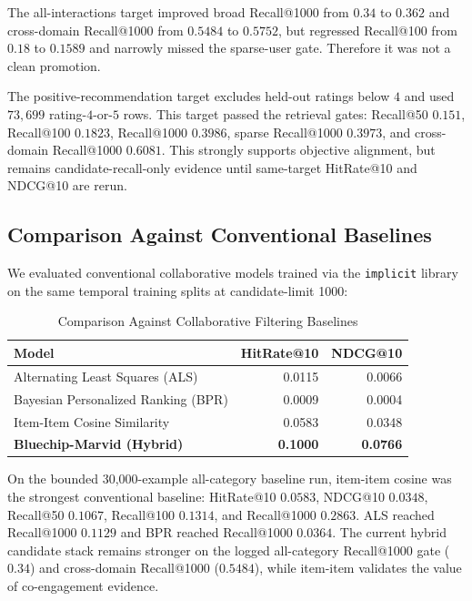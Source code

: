 \documentclass[11pt,a4paper]{article}
\begin{document}
The all-interactions target improved broad Recall@1000 from $0.34$ to $0.362$ and cross-domain Recall@1000 from $0.5484$ to $0.5752$, but regressed Recall@100 from $0.18$ to $0.1589$ and narrowly missed the sparse-user gate. Therefore it was not a clean promotion.

The positive-recommendation target excludes held-out ratings below $4$ and used $73{,}699$ rating-$4$-or-$5$ rows. This target passed the retrieval gates: Recall@50 $0.151$, Recall@100 $0.1823$, Recall@1000 $0.3986$, sparse Recall@1000 $0.3973$, and cross-domain Recall@1000 $0.6081$. This strongly supports objective alignment, but remains candidate-recall-only evidence until same-target HitRate@10 and NDCG@10 are rerun.

\subsection{Comparison Against Conventional Baselines}
We evaluated conventional collaborative models trained via the \texttt{implicit} library on the same temporal training splits at candidate-limit 1000:
\begin{table}[h!]
\centering
\caption{Comparison Against Collaborative Filtering Baselines}
\begin{tabular}{lrr}
\toprule
\textbf{Model} & \textbf{HitRate@10} & \textbf{NDCG@10} \\
\midrule
Alternating Least Squares (ALS) & 0.0115 & 0.0066 \\
Bayesian Personalized Ranking (BPR) & 0.0009 & 0.0004 \\
Item-Item Cosine Similarity & 0.0583 & 0.0348 \\
\textbf{Bluechip-Marvid (Hybrid)} & \textbf{0.1000} & \textbf{0.0766} \\
\bottomrule
\end{tabular}
\end{table}

On the bounded 30,000-example all-category baseline run, item-item cosine was the strongest conventional baseline: HitRate@10 $0.0583$, NDCG@10 $0.0348$, Recall@50 $0.1067$, Recall@100 $0.1314$, and Recall@1000 $0.2863$. ALS reached Recall@1000 $0.1129$ and BPR reached Recall@1000 $0.0364$. The current hybrid candidate stack remains stronger on the logged all-category Recall@1000 gate ($0.34$) and cross-domain Recall@1000 ($0.5484$), while item-item validates the value of co-engagement evidence.
\end{document}
